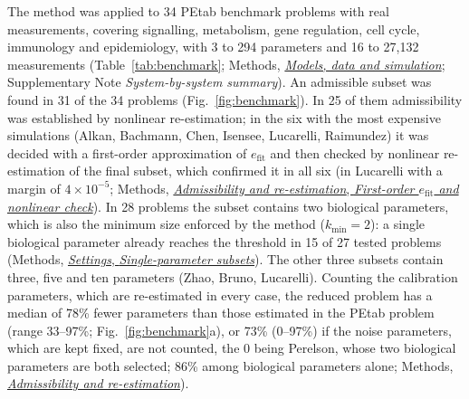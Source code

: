 \documentclass[pdflatex,sn-nature]{sn-jnl}
\theoremstyle{plain}
\newcommand{\mref}[2]{\hyperref[#1]{#2}}
\begin{document}
The method was applied to 34 PEtab benchmark problems with real measurements\cite{bib31,bib27}, covering signalling, metabolism, gene regulation, cell cycle, immunology and epidemiology, with 3 to 294 parameters and 16 to 27,132 measurements (Table~\ref{tab:benchmark}; Methods, \mref{met:models}{\emph{Models, data and simulation}}; Supplementary Note \textit{System-by-system summary}). An admissible subset was found in 31 of the 34 problems (Fig.~\ref{fig:benchmark}). In 25 of them admissibility was established by nonlinear re-estimation; in the six with the most expensive simulations (Alkan, Bachmann, Chen, Isensee, Lucarelli, Raimundez) it was decided with a first-order approximation of $e_{\mathrm{fit}}$ and then checked by nonlinear re-estimation of the final subset, which confirmed it in all six (in Lucarelli with a margin of $4\times10^{-5}$; Methods, \mref{met:adm-firstorder}{\emph{Admissibility and re-estimation}, \emph{First-order $e_{\mathrm{fit}}$ and nonlinear check}}). In 28 problems the subset contains two biological parameters, which is also the minimum size enforced by the method ($k_{\min}=2$): a single biological parameter already reaches the threshold in 15 of 27 tested problems (Methods, \mref{met:single}{\emph{Settings}, \emph{Single-parameter subsets}}). The other three subsets contain three, five and ten parameters (Zhao, Bruno, Lucarelli). Counting the calibration parameters, which are re-estimated in every case, the reduced problem has a median of 78\% fewer parameters than those estimated in the PEtab problem (range 33--97\%; Fig.~\ref{fig:benchmark}a), or 73\% (0--97\%) if the noise parameters, which are kept fixed, are not counted, the 0 being Perelson, whose two biological parameters are both selected; 86\% among biological parameters alone; Methods, \mref{met:adm}{\emph{Admissibility and re-estimation}}).
\end{document}
